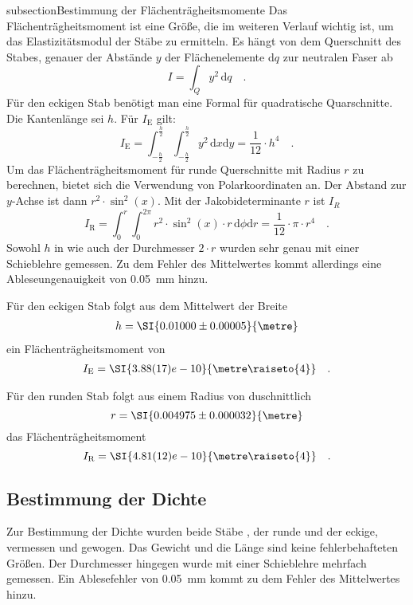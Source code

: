subsection{Bestimmung der Flächenträgheitsmomente}
Das Flächenträgheitsmoment ist eine Größe, die im weiteren Verlauf wichtig ist, um das Elastizitätsmodul der Stäbe zu ermitteln.
Es hängt von dem Querschnitt des Stabes, genauer der Abstände $y$ der Flächenelemente d$q$ zur neutralen Faser ab
\begin{equation}
I = \int_{Q} y ^2 \, \text{d}q \quad .
\end{equation}
Für den eckigen Stab benötigt man eine Formal für quadratische Quarschnitte. Die Kantenlänge sei $h$. Für $I_\text{E}$ gilt:
\begin{equation}
I_\text{E} = \int_{-\frac{h}{2}}^{\frac{h}{2}} \int_{-\frac{h}{2}}^{\frac{h}{2}} y^2\,  \text{d}x \text{d}y = \frac{1}{12} \cdot h^4 \quad .
\end{equation}
Um das Flächenträgheitsmoment für runde Querschnitte mit Radius $r$ zu berechnen, bietet sich die Verwendung von Polarkoordinaten an. Der Abstand zur $y$-Achse ist dann $r^2 \cdot \sin^2(x)$.  Mit der Jakobideterminante $r$ ist $I_R$
\begin{equation}
I_\text{R} = \int_{0}^{r}  \int_{0}^{2\pi} r^2 \cdot \sin^2(x) \cdot r  \, \text{d}\phi \text{d}r = \frac{1}{12}\cdot \pi \cdot r^4 \quad .
\end{equation}
Sowohl $h$ in wie auch der Durchmesser $2 \cdot r$ wurden sehr genau mit einer Schieblehre gemessen. Zu dem Fehler des Mittelwertes kommt allerdings eine Ableseungenauigkeit von \SI{0.05}{\milli\metre}  hinzu.



Für den eckigen Stab folgt aus dem Mittelwert der Breite
\begin{align}
  h = \SI{0.01000 \pm 0.00005}{\metre}
\end{align}
ein Flächenträgheitsmoment von
\begin{align}
I_\text{E}=\SI{3.88(17)e-10}{\metre\raiseto{4}} \quad .
\end{align}

Für den runden Stab folgt aus einem Radius von duschnittlich
\begin{equation}
  r = \SI{0.004975 \pm 0.000032}{\metre}
\end{equation}
das Flächenträgheitsmoment
\begin{equation}
  I_\text{R} = \SI{4.81(12)e-10}{\metre\raiseto{4}} \quad .
\end{equation}









\subsection{Bestimmung der Dichte}
Zur Bestimmung der Dichte wurden beide Stäbe , der runde und der eckige, vermessen und gewogen. Das Gewicht und die Länge sind keine fehlerbehafteten Größen. Der Durchmesser hingegen wurde mit einer Schieblehre mehrfach gemessen. Ein Ablesefehler von \SI{0.05}{\milli\metre}  kommt zu dem Fehler des Mittelwertes hinzu.
